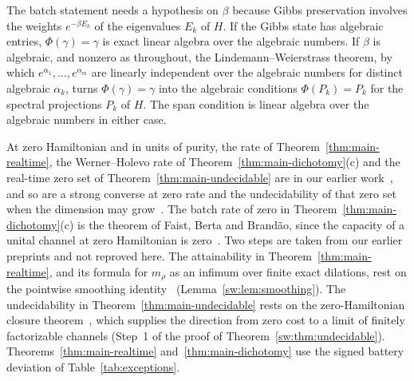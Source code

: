The batch statement needs a hypothesis on $\beta$ because Gibbs preservation involves the weights $e^{-\beta E_k}$ of the eigenvalues $E_k$ of $H$. If the Gibbs state has algebraic entries, $\Phi(\gamma)=\gamma$ is exact linear algebra over the algebraic numbers. If $\beta$ is algebraic, and nonzero as throughout, the Lindemann--Weierstrass theorem, by which $e^{\alpha_1},\dots,e^{\alpha_m}$ are linearly independent over the algebraic numbers for distinct algebraic $\alpha_k$, turns $\Phi(\gamma)=\gamma$ into the algebraic conditions $\Phi(P_k)=P_k$ for the spectral projections $P_k$ of $H$. The span condition is linear algebra over the algebraic numbers in either case.

At zero Hamiltonian and in units of purity, the rate of Theorem~\ref{thm:main-realtime}, the Werner--Holevo rate of Theorem~\ref{thm:main-dichotomy}(c) and the real-time zero set of Theorem~\ref{thm:main-undecidable} are in our earlier work~\cite{Memory,ImmediateDelivery,Douglas26closed}, and so are a strong converse at zero rate and the undecidability of that zero set when the dimension may grow~\cite{Flagship}. The batch rate of zero in Theorem~\ref{thm:main-dichotomy}(c) is the theorem of Faist, Berta and Brand\~ao, since the capacity of a unital channel at zero Hamiltonian is zero~\cite{FBB21}. Two steps are taken from our earlier preprints and not reproved here. The attainability in Theorem~\ref{thm:main-realtime}, and its formula for $m_\rho$ as an infimum over finite exact dilations, rest on the pointwise smoothing identity~\cite[Thm.~4.1, Cor.~4.3]{Douglas26closed} (Lemma~\ref{sw:lem:smoothing}). The undecidability in Theorem~\ref{thm:main-undecidable} rests on the zero-Hamiltonian closure theorem~\cite[Thm.~3.2(a)]{Memory}, which supplies the direction from zero cost to a limit of finitely factorizable channels (Step~1 of the proof of Theorem~\ref{sw:thm:undecidable}). Theorems~\ref{thm:main-realtime} and~\ref{thm:main-dichotomy} use the signed battery deviation of Table~\ref{tab:exceptions}.


